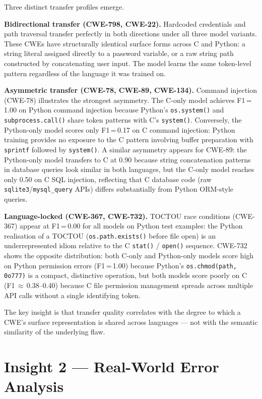 Three distinct transfer profiles emerge.

\textbf{Bidirectional transfer (CWE-798, CWE-22).}
Hardcoded credentials and path traversal transfer perfectly in both directions under all
three model variants.
These CWEs have structurally identical surface forms across C and Python: a string literal
assigned directly to a password variable, or a raw string path constructed by concatenating
user input.
The model learns the same token-level pattern regardless of the language it was trained on.

\textbf{Asymmetric transfer (CWE-78, CWE-89, CWE-134).}
Command injection (CWE-78) illustrates the strongest asymmetry.
The C-only model achieves F1\,=\,1.00 on Python command injection because Python's
\texttt{os.system()} and \texttt{subprocess.call()} share token patterns with C's
\texttt{system()}.
Conversely, the Python-only model scores only F1\,=\,0.17 on C command injection:
Python training provides no exposure to the C pattern involving buffer preparation with
\texttt{sprintf} followed by \texttt{system()}.
A similar asymmetry appears for CWE-89: the Python-only model transfers to C at 0.90
because string concatenation patterns in database queries look similar in both languages,
but the C-only model reaches only 0.50 on C SQL injection, reflecting that C database
code (raw \texttt{sqlite3}/\texttt{mysql\_query} APIs) differs substantially from
Python ORM-style queries.

\textbf{Language-locked (CWE-367, CWE-732).}
TOCTOU race conditions (CWE-367) appear at F1\,=\,0.00 for all models on Python test
examples: the Python realisation of a TOCTOU (\texttt{os.path.exists()} before file open)
is an underrepresented idiom relative to the C \texttt{stat()} / \texttt{open()} sequence.
CWE-732 shows the opposite distribution: both C-only and Python-only models score high on
Python permission errors (F1\,=\,1.00) because Python's \texttt{os.chmod(path, 0o777)}
is a compact, distinctive operation, but both models score poorly on C (F1\,$\approx$\,0.38--0.40)
because C file permission management spreads across multiple API calls without a single
identifying token.

The key insight is that transfer quality correlates with the degree to which a CWE's surface
representation is shared across languages --- not with the semantic similarity of the
underlying flaw.

\section{Insight 2 --- Real-World Error Analysis}

